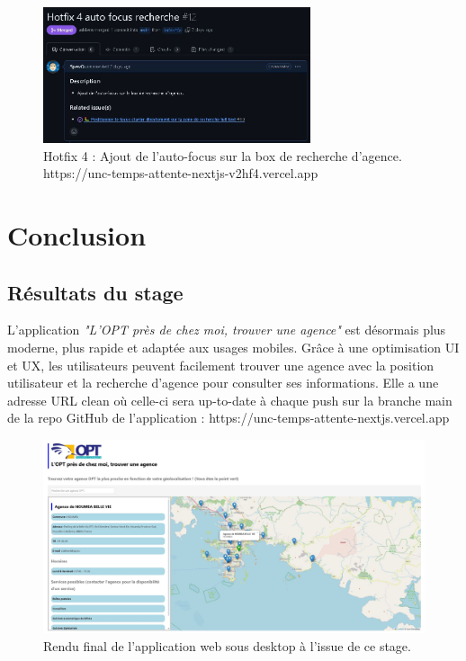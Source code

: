 \documentclass[12pt,a4paper]{report}
\begin{document}
\begin{figure}[h] %
    \centering
    \includegraphics[width=0.7\textwidth]{ressources_rapport/extrait_pr_12.JPG}
    \caption{Hotfix 4 : Ajout de l'auto-focus sur la box de recherche d'agence. https://unc-temps-attente-nextjs-v2hf4.vercel.app}
\end{figure}

\chapter{Conclusion}
\section{Résultats du stage}
L’application \textit{"L'OPT près de chez moi, trouver une agence"} est désormais plus moderne, plus rapide et adaptée aux usages mobiles. Grâce à une optimisation UI et UX, les utilisateurs peuvent facilement trouver une agence avec la position utilisateur et la recherche d'agence pour consulter ses informations. Elle a une adresse URL clean où celle-ci sera up-to-date à chaque push sur la branche main de la repo GitHub de l'application : https://unc-temps-attente-nextjs.vercel.app
\begin{figure}[h] %
    \centering
    \includegraphics[width=1\textwidth]{ressources_rapport/app_opt.JPG}
    \caption{Rendu final de l'application web sous desktop à l'issue de ce stage.}
\end{figure}
\newpage
\end{document}
